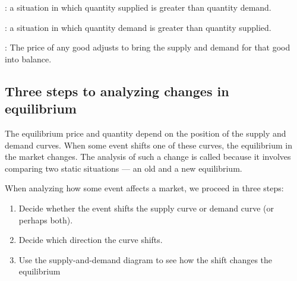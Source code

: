:
a situation in which quantity supplied is greater than quantity demand.

:
a situation in which quantity demand is greater than quantity supplied.

:
The price of any good adjusts to bring the supply and demand for that good into balance.

\subsection{Three steps to analyzing changes in equilibrium}

The equilibrium price and quantity depend on the position of the supply and demand curves.
When some event shifts one of these curves, the equilibrium in the market changes.
The analysis of such a change is called 
because it involves comparing two static situations --- an old and a new equilibrium.


When analyzing how some event affects a market, we proceed in three steps:
\begin{tcolorbox}
\begin{enumerate}
\item Decide whether the event shifts the supply curve or demand curve (or perhaps both).
\item Decide which direction the curve shifts.
\item Use the supply-and-demand diagram to see how the shift changes the equilibrium
\end{enumerate}  
\end{tcolorbox}



